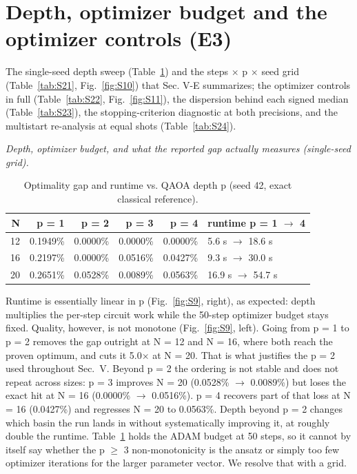 \documentclass[journal]{IEEEtran}
\begin{document}
\section{Depth, optimizer budget and the optimizer controls (E3)}


The single-seed depth sweep (Table~\ref{tab:S20}) and the steps $\times$ p $\times$ seed grid (Table~\ref{tab:S21}, Fig.~\ref{fig:S10}) that Sec. V-E summarizes; the optimizer controls in full (Table~\ref{tab:S22}, Fig.~\ref{fig:S11}), the dispersion behind each signed median (Table~\ref{tab:S23}), the stopping-criterion diagnostic at both precisions, and the multistart re-analysis at equal shots (Table~\ref{tab:S24}).


\textit{Depth, optimizer budget, and what the reported gap actually measures (single-seed grid).}





\begin{table}[!t]
\centering
\scriptsize
\caption{Optimality gap and runtime vs. QAOA depth p (seed 42, exact classical reference).}
\label{tab:S20}
\begin{tabular}{rrrrrl}
\toprule
N & p = 1 & p = 2 & p = 3 & p = 4 & runtime p = 1 $\rightarrow$ 4 \\
\midrule
12 & 0.1949\% & 0.0000\% & 0.0000\% & 0.0000\% & 5.6 s $\rightarrow$ 18.6 s \\
16 & 0.2197\% & 0.0000\% & 0.0516\% & 0.0427\% & 9.3 s $\rightarrow$ 30.0 s \\
20 & 0.2651\% & 0.0528\% & 0.0089\% & 0.0563\% & 16.9 s $\rightarrow$ 54.7 s \\
\bottomrule
\end{tabular}
\end{table}


Runtime is essentially linear in p (Fig.~\ref{fig:S9}, right), as expected: depth multiplies the per-step circuit work while the 50-step optimizer budget stays fixed. Quality, however, is not monotone (Fig.~\ref{fig:S9}, left). Going from p = 1 to p = 2 removes the gap outright at N = 12 and N = 16, where both reach the proven optimum, and cuts it 5.0$\times$ at N = 20. That is what justifies the p = 2 used throughout Sec.~V. Beyond p = 2 the ordering is not stable and does not repeat across sizes: p = 3 improves N = 20 (0.0528\% $\rightarrow$ 0.0089\%) but loses the exact hit at N = 16 (0.0000\% $\rightarrow$ 0.0516\%). p = 4 recovers part of that loss at N = 16 (0.0427\%) and regresses N = 20 to 0.0563\%. Depth beyond p = 2 changes which basin the run lands in without systematically improving it, at roughly double the runtime. Table~\ref{tab:S20} holds the ADAM budget at 50 steps, so it cannot by itself say whether the p $\geq$ 3 non-monotonicity is the ansatz or simply too few optimizer iterations for the larger parameter vector. We resolve that with a grid.
\end{document}
